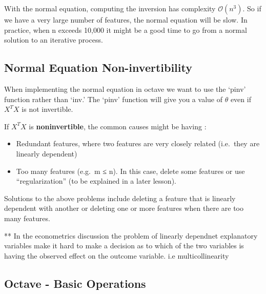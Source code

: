 \documentclass[
]{article}
\newenvironment{Shaded}{\begin{snugshade}}{\end{snugshade}}
\newcommand{\CommentTok}[1]{\textcolor[rgb]{0.56,0.35,0.01}{\textit{#1}}}
\newcommand{\FloatTok}[1]{\textcolor[rgb]{0.00,0.00,0.81}{#1}}
\newcommand{\OperatorTok}[1]{\textcolor[rgb]{0.81,0.36,0.00}{\textbf{#1}}}
\providecommand{\tightlist}{%
  \setlength{\itemsep}{0pt}\setlength{\parskip}{0pt}}
\begin{document}
With the normal equation, computing the inversion has complexity
\(\mathcal{O}(n^3)\). So if we have a very large number of features, the
normal equation will be slow. In practice, when n exceeds 10,000 it
might be a good time to go from a normal solution to an iterative
process.

\hypertarget{normal-equation-non-invertibility}{%
\subsection{Normal Equation
Non-invertibility}\label{normal-equation-non-invertibility}}

When implementing the normal equation in octave we want to use the
`pinv' function rather than `inv.' The `pinv' function will give you a
value of \(\theta\) even if \(X^TX\) is not invertible.

If \(X^TX\) is \textbf{noninvertible}, the common causes might be having
:

\begin{itemize}
\tightlist
\item
  Redundant features, where two features are very closely related
  (i.e.~they are linearly dependent)
\item
  Too many features (e.g.~m ≤ n). In this case, delete some features or
  use ``regularization'' (to be explained in a later lesson).
\end{itemize}

Solutions to the above problems include deleting a feature that is
linearly dependent with another or deleting one or more features when
there are too many features.

** In the econometrics discussion the problem of linearly dependnet
explanatory variables make it hard to make a decision as to which of the
two variables is having the observed effect on the outcome variable. i.e
multicollinearity

\hypertarget{octave---basic-operations}{%
\subsection{Octave - Basic Operations}\label{octave---basic-operations}}

\begin{Shaded}
\end{Shaded}
\end{document}
